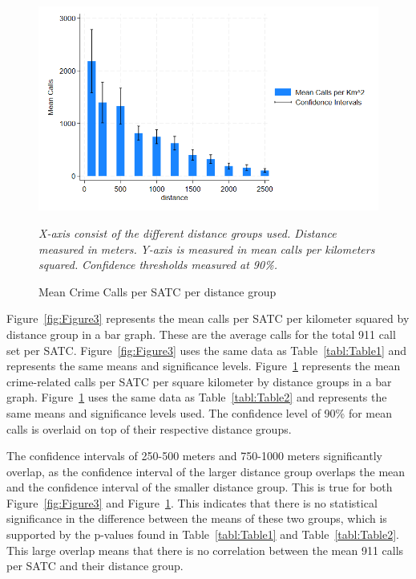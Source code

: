 \documentclass[12pt]{article}
\begin{document}
\begin{figure}[htbp]
    \centering
\includegraphics[width=0.75\linewidth]{Reproducibility Package/Visual Graphics/Crime_CI_Graph.png}
    \caption{Mean Crime Calls per SATC per distance group}
    \label{fig:Figure4}
        \textit{X-axis consist of the different distance groups used. Distance measured in meters.}
    \textit{Y-axis is measured in mean calls per kilometers squared.}
     \textit{Confidence thresholds measured at 90\%.}
\end{figure}

Figure~\ref{fig:Figure3} represents the mean calls per SATC per kilometer squared by distance group in a bar graph. These are the average calls for the total 911 call set per SATC. Figure~\ref{fig:Figure3} uses the same data as Table~\ref{tabl:Table1} and represents the same means and significance levels. Figure~\ref{fig:Figure4} represents the mean crime-related calls per SATC per square kilometer by distance groups in a bar graph. Figure~\ref{fig:Figure4} uses the same data as Table~\ref{tabl:Table2} and represents the same means and significance levels used. The confidence level of 90\% for mean calls is overlaid on top of their respective distance groups. 

The confidence intervals of 250-500 meters and 750-1000 meters significantly overlap, as the confidence interval of the larger distance group overlaps the mean and the confidence interval of the smaller distance group. This is true for both Figure~\ref{fig:Figure3} and Figure~\ref{fig:Figure4}. This indicates that there is no statistical significance in the difference between the means of these two groups, which is supported by the p-values found in Table~\ref{tabl:Table1} and Table~\ref{tabl:Table2}. This large overlap means that there is no correlation between the mean 911 calls per SATC and their distance group. 
\end{document}
